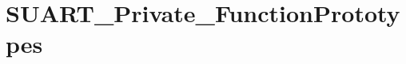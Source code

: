 \hypertarget{group___s_u_a_r_t___private___function_prototypes}{}\section{S\+U\+A\+R\+T\+\_\+\+Private\+\_\+\+Function\+Prototypes}
\label{group___s_u_a_r_t___private___function_prototypes}
